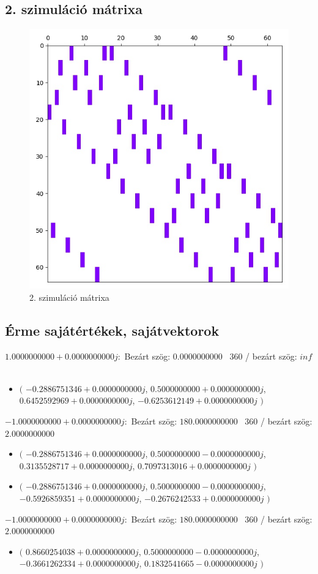 \documentclass[14pt,a4paper]{article}
\begin{document}
\subsection{2. szimuláció mátrixa}
\begin{figure}[H]
\centering
\includegraphics[width = 0.7\columnwidth]{sim_02/simulation_matrix.jpg}
\caption{2. szimuláció mátrixa}
\end{figure}
\subsection{Érme sajátértékek, sajátvektorok}
$1.0000000000+0.0000000000j$:\
Bezárt szög: $0.0000000000$ \
360 / bezárt szög: $inf$\
\begin{itemize}
\item
$\big($
$-0.2886751346+0.0000000000j$, $0.5000000000+0.0000000000j$, $0.6452592969+0.0000000000j$, $-0.6253612149+0.0000000000j$
$\big)$
\end{itemize}
$-1.0000000000+0.0000000000j$:\
Bezárt szög: $180.0000000000$ \
360 / bezárt szög: $2.0000000000$\
\begin{itemize}
\item
$\big($
$-0.2886751346+0.0000000000j$, $0.5000000000-0.0000000000j$, $0.3135528717+0.0000000000j$, $0.7097313016+0.0000000000j$
$\big)$
\item
$\big($
$-0.2886751346+0.0000000000j$, $0.5000000000-0.0000000000j$, $-0.5926859351+0.0000000000j$, $-0.2676242533+0.0000000000j$
$\big)$
\end{itemize}
$-1.0000000000+0.0000000000j$:\
Bezárt szög: $180.0000000000$ \
360 / bezárt szög: $2.0000000000$\
\begin{itemize}
\item
$\big($
$0.8660254038+0.0000000000j$, $0.5000000000-0.0000000000j$, $-0.3661262334+0.0000000000j$, $0.1832541665-0.0000000000j$
$\big)$
\end{itemize}
\end{document}

